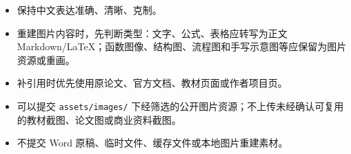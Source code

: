 \begin{itemize}
\tightlist
\item
  保持中文表达准确、清晰、克制。
\item
  重建图片内容时，先判断类型：文字、公式、表格应转写为正文 Markdown/LaTeX；函数图像、结构图、流程图和手写示意图等应保留为图片资源或重画。
\item
  补引用时优先使用原论文、官方文档、教材页面或作者项目页。
\item
  可以提交 \texttt{assets/images/} 下经筛选的公开图片资源；不上传未经确认可复用的教材截图、论文图或商业资料截图。
\item
  不提交 Word 原稿、临时文件、缓存文件或本地图片重建素材。
\end{itemize}

\clearpage

